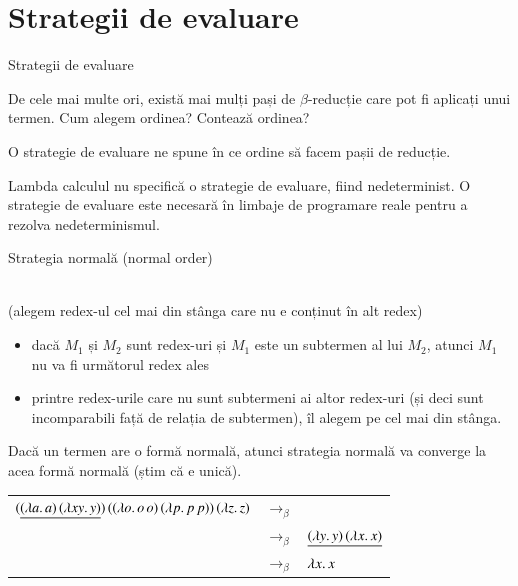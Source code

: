 \documentclass[xcolor=pdftex,romanian,colorlinks]{beamer}
\begin{document}
\section{\color{section-color} Strategii de evaluare}

\begin{frame}[fragile]{Strategii de evaluare}

De cele mai multe ori, există mai mulți pași de $\beta$-reducție care pot fi aplicați unui termen. Cum alegem ordinea? Contează ordinea?

\medskip  
O \alert{strategie de evaluare} ne spune în ce ordine să facem pașii de reducție.


\medskip  
Lambda calculul nu specifică o strategie de evaluare, fiind \alert{nedeterminist}. O strategie de evaluare este necesară în limbaje de programare reale pentru a rezolva nedeterminismul.

\end{frame}

\begin{frame}[fragile]{Strategia normală (normal order)}

\\
(alegem redex-ul cel mai din stânga care nu e conținut în alt redex)

\begin{itemize}
	\item dacă $M_1$ și $M_2$ sunt redex-uri  și $M_1$ este un subtermen al lui $M_2$, atunci $M_1$ {\color{False} nu} va fi următorul redex ales
	\item printre redex-urile care nu sunt subtermeni ai altor redex-uri (și deci sunt incomparabili față de relația de subtermen), îl alegem pe cel mai din stânga.
\end{itemize}

\alert{Dacă un termen are o formă normală, atunci strategia normală va converge la acea formă normală (știm că e unică)}.

{\footnotesize
\begin{center}
\begin{tabular}{rcl} 
$(\underline{(\lambda a.\,a)\, (\lambda xy.\,y)})\, ((\lambda o.\,o\, o)\, (\lambda p.\,p\, p))\, (\lambda z.\,z)$ & $\rightarrow_\beta$ \\
\onslide<2>{
$\app{\underline{\app{(\abs{xy}{y})}{(\app{(\abs{o}{\app{o}{o}})}{(\abs{p}{\app{p}{p}})})}}}{(\abs{z}{z})}$ & $\rightarrow_\beta$ & $\underline{(\lambda y.\,y)\, (\lambda x.\,x)}$ \\
&$\rightarrow_\beta$ & $\lambda x.\,x$
}
\end{tabular}
\end{center}
}

\end{frame}
\end{document}
